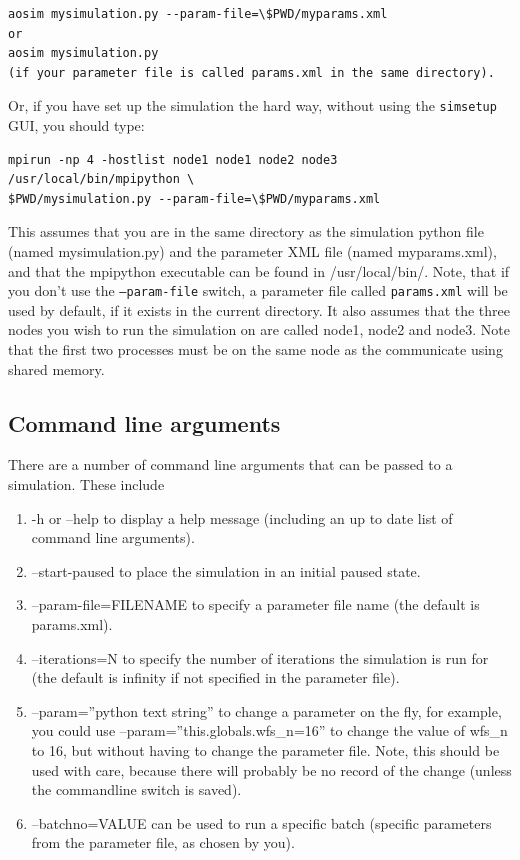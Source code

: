 \documentclass{article}
\begin{document}
\begin{verbatim}
aosim mysimulation.py --param-file=\$PWD/myparams.xml
or
aosim mysimulation.py
(if your parameter file is called params.xml in the same directory).
\end{verbatim}

Or, if you have set up the simulation the hard way, without using the
\texttt{simsetup} GUI, you should type:
\begin{verbatim}
mpirun -np 4 -hostlist node1 node1 node2 node3 /usr/local/bin/mpipython \
$PWD/mysimulation.py --param-file=\$PWD/myparams.xml
\end{verbatim}

This assumes that you are in the same directory as the simulation
python file (named mysimulation.py) and the parameter XML file (named
myparams.xml), and that the mpipython executable can be found in
/usr/local/bin/.  Note, that if you don't use the
\texttt{--param-file} switch, a parameter file called
\texttt{params.xml} will be used by default, if it exists in the
current directory.  It also assumes that the three nodes you wish to
run the simulation on are called node1, node2 and node3.  Note that
the first two processes must be on the same node as the communicate
using shared memory.

\subsection{Command line arguments}
There are a number of command line arguments that can be passed to a
simulation.  These include
\begin{enumerate}
\item -h or --help to display a help message (including an up to date
  list of command line arguments).
\item --start-paused to place the simulation in an initial paused
  state.
\item --param-file=FILENAME to specify a parameter file name (the
  default is params.xml).
\item --iterations=N to specify the number of iterations the simulation
  is run for (the default is infinity if not specified in the
  parameter file).
\item --param=''python text string'' to change a parameter on the fly,
  for example, you could use --param=''this.globals.wfs\_n=16'' to
  change the value of wfs\_n to 16, but without having to change the
  parameter file.  Note, this should be used with care, because there
  will probably be no record of the change (unless the commandline
  switch is saved).
\item --batchno=VALUE can be used to run a specific batch (specific
  parameters from the parameter file, as chosen by you).
\end{enumerate}
\end{document}
